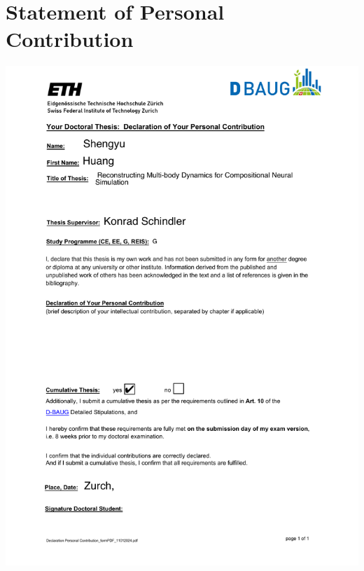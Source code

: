 \chapter{Statement of Personal Contribution}
\label{chap:contribution}
\noindent
\includegraphics[width=\textwidth]{tex/10_Contribution.pdf}
